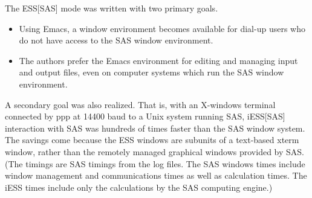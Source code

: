 \documentclass{article}
\begin{document}
The ESS[SAS] mode was written with two primary goals.
\begin{itemize}
\item Using Emacs, a window environment becomes available for dial-up
  users who do not have access to the SAS window environment.
\item The authors prefer the Emacs environment for editing and
  managing input and output files, even on computer systems which run
  the SAS window environment.
\end{itemize}
A secondary goal was also realized.  That is, with an X-windows
terminal connected by ppp at 14400 baud to a Unix system running SAS,
iESS[SAS] interaction with SAS was hundreds of times faster than the
SAS window system.  The savings come because the ESS windows are
subunits of a text-based xterm window, rather than the remotely
managed graphical windows provided by SAS.  (The timings are SAS
timings from the log files.  The SAS windows times include window
management and communications times as well as calculation times.  The
iESS times include only the calculations by the SAS computing engine.)






\end{document}
